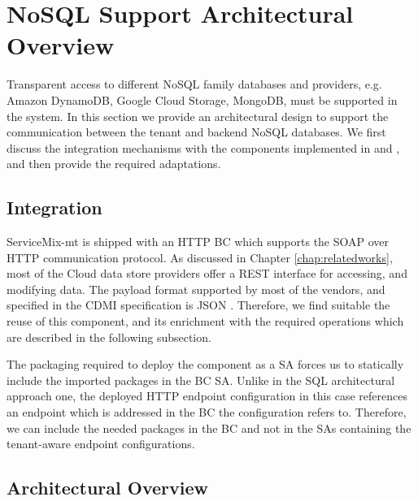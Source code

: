 \section{NoSQL Support Architectural Overview}
\label{sec:designnosql}

Transparent access to different \ac{NoSQL} family databases and providers, e.g. Amazon DynamoDB, Google Cloud Storage, MongoDB, must be supported in the system. In this section we provide an architectural design to support the communication between the tenant and backend \ac{NoSQL} databases. We first discuss the integration mechanisms with the components implemented in \cite{Muhler2012} and \cite{gomez2012}, and then provide the required adaptations.

\subsection{Integration}


 ServiceMix-mt is shipped with an \ac{HTTP} \ac{BC} which supports the \ac{SOAP} over \ac{HTTP} communication protocol. As discussed in Chapter \ref{chap:relatedworks}, most of the Cloud data store providers offer a REST interface for accessing, and modifying data. The payload format supported by most of the vendors, and specified in the CDMI specification is \ac{JSON} \cite{cdmispec2012}. Therefore, we find suitable the reuse of this component, and its enrichment with the required operations which are described in the following subsection. 
 
The packaging required to deploy the component as a \ac{SA} forces us to statically include the imported packages in the \ac{BC} \ac{SA}. Unlike in the \ac{SQL} architectural approach one, the deployed \ac{HTTP} endpoint configuration in this case references an endpoint which is addressed in the \ac{BC} the configuration refers to. Therefore, we can include the needed packages in the \ac{BC} and not in the \ac{SA}s containing the tenant-aware endpoint configurations.

\subsection{Architectural Overview}

